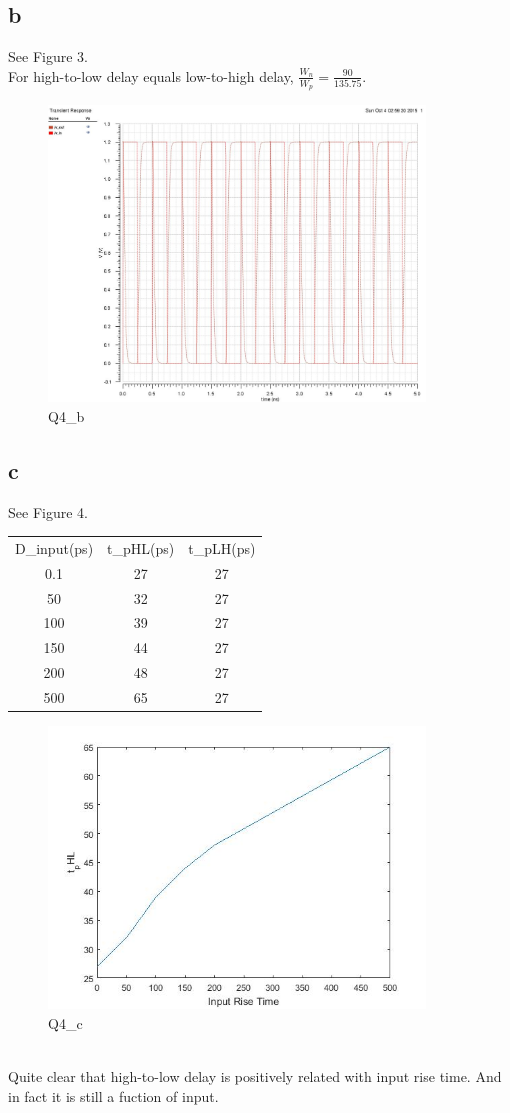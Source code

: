 \documentclass[a4paper,10pt]{article}
\begin{document}
\subsection*{b}
See Figure 3.\\
For high-to-low delay equals low-to-high delay, \begin{math}\frac{W_n}{W_p} = \frac{90}{135.75}\end{math}.\\
\begin{figure}
 \centering
 \includegraphics[width=10cm]{Q4_b.jpg}
 \caption{Q4\_b}
\end{figure}

\subsection*{c}
See Figure 4.\\

\begin{tabular}{c c c}
 D\_input(ps)	&	t\_pHL(ps)	&	t\_pLH(ps)\\
 0.1		&	27		&	27\\
 50		&	32		&	27\\
 100		&	39		&	27\\
 150		&	44		&	27\\
 200		&	48		&	27\\
 500		&	65		&	27\\
\end{tabular}
\begin{figure}
 \centering
 \includegraphics[width=10cm]{Q4_c.jpg}
 \caption{Q4\_c}
\end{figure}
\\
Quite clear that high-to-low delay is positively related with input rise time. And in fact it is still a fuction of input.
\end{document}
